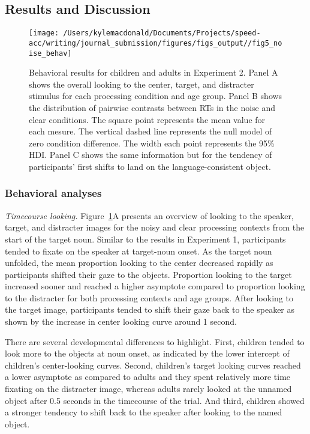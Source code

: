 \documentclass[,man,floatsintext]{apa6}
\begin{document}
\hypertarget{results-and-discussion}{%
\subsection{Results and Discussion}\label{results-and-discussion}}

\begin{figure}[!t]

{\centering \texttt{[image: /Users/kylemacdonald/Documents/Projects/speed-acc/writing/journal\_submission/figures/figs\_output//fig5\_noise\_behav]} 

}

\caption{Behavioral results for children and adults in Experiment 2. Panel A shows the overall looking to the center, target, and distracter stimulus for each processing condition and age group. Panel B shows the distribution of pairwise contrasts between RTs in the noise and clear conditions. The square point represents the mean value for each mesure. The vertical dashed line represents the null model of zero condition difference. The width each point represents the 95\% HDI. Panel C shows the same information but for the tendency of participants' first shifts to land on the language-consistent object.}\label{fig:noise-acc-rt-plot}
\end{figure}

\hypertarget{behavioral-analyses-1}{%
\subsubsection{Behavioral analyses}\label{behavioral-analyses-1}}

\emph{Timecourse looking.} Figure~\ref{fig:noise-acc-rt-plot}A presents
an overview of looking to the speaker, target, and distracter images for
the noisy and clear processing contexts from the start of the target
noun. Similar to the results in Experiment 1, participants tended to
fixate on the speaker at target-noun onset. As the target noun unfolded,
the mean proportion looking to the center decreased rapidly as
participants shifted their gaze to the objects. Proportion looking to
the target increased sooner and reached a higher asymptote compared to
proportion looking to the distracter for both processing contexts and
age groups. After looking to the target image, participants tended to
shift their gaze back to the speaker as shown by the increase in center
looking curve around 1 second.

There are several developmental differences to highlight. First,
children tended to look more to the objects at noun onset, as indicated
by the lower intercept of children's center-looking curves. Second,
children's target looking curves reached a lower asymptote as compared
to adults and they spent relatively more time fixating on the distracter
image, whereas adults rarely looked at the unnamed object after 0.5
seconds in the timecourse of the trial. And third, children showed a
stronger tendency to shift back to the speaker after looking to the
named object.
\end{document}
